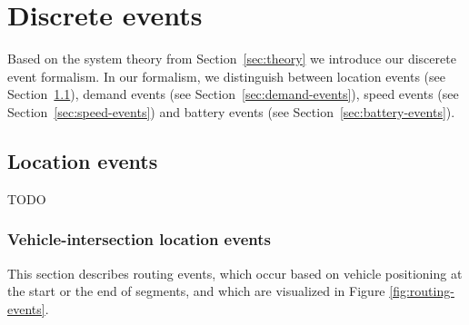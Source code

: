 \documentclass[graybox]{svmult}
\begin{document}
\section{Discrete events}
\label{sec:events}

Based on the system theory from Section~\ref{sec:theory} we introduce our discerete event formalism.
In our formalism, we distinguish between location events (see Section~\ref{sec:location-events}), demand events (see Section~\ref{sec:demand-events}), speed events (see Section~\ref{sec:speed-events}) and battery events (see Section~\ref{sec:battery-events}).

\subsection{Location events}
\label{sec:location-events}

TODO

\subsubsection{Vehicle-intersection location events}
\label{sec:intersection-location-event}

This section describes routing events, which occur based on vehicle positioning at the start or the end of segments, and which are visualized in Figure \ref{fig:routing-events}. 
\end{document}

